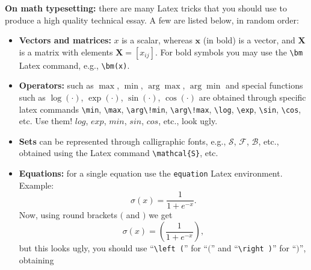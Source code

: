 
\noindent \textbf{On math typesetting:} there are many Latex tricks that you should use to produce a high quality technical essay. A few are listed below, in random order:
\begin{itemize}
\item \textbf{Vectors and matrices:} $x$ is a scalar, whereas $\bm{x}$ (in bold) is a vector, and $\bm{X}$ is a matrix with elements $\bm{X} = [x_{ij}]$. For bold symbols you may use the \texttt{\textbackslash bm} Latex command, e.g., \texttt{\textbackslash bm(x)}.
\item \textbf{Operators:} such as $\max$, $\min$, $\arg\!\max$, $\arg\!\min$ and special functions such as $\log(\cdot)$, $\exp(\cdot)$, $\sin(\cdot)$, $\cos(\cdot)$ are obtained through specific latex commands \texttt{\textbackslash min}, \texttt{\textbackslash max}, \texttt{\textbackslash arg\textbackslash!min}, \texttt{\textbackslash arg\textbackslash!max}, \texttt{\textbackslash log}, \texttt{\textbackslash exp}, \texttt{\textbackslash sin}, \texttt{\textbackslash cos}, etc. Use them! $log$, $exp$, $min$, $sin$, $cos$, etc., look ugly.
\item \textbf{Sets} can be represented through calligraphic fonts, e.g., $\mathcal{S}$, $\mathcal{F}$, $\mathcal{B}$, etc., obtained using the Latex command \texttt{\textbackslash mathcal{\{S\}}}, etc.
\item \textbf{Equations:} for a single equation use the \texttt{equation} Latex environment. Example: 
\begin{equation}
\label{eq:sigmoid}
\sigma(x) = \frac{1}{1+e^{-x}}.
\end{equation} 
Now, using round brackets $($ and $)$ we get
\begin{equation}
\label{eq:sigmoid_comma}
\sigma(x) = (\frac{1}{1+e^{-x}}),
\end{equation} 
but this looks ugly, you should use ``\texttt{\textbackslash left (}'' for ``$($'' and ``\texttt{\textbackslash right )}'' for ``$)$'', obtaining
\begin{equation}

\end{equation}
\end{itemize}
